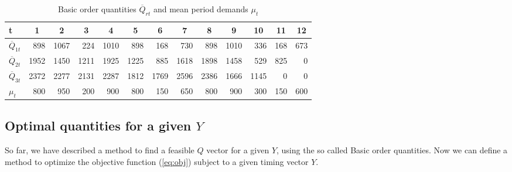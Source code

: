 \begin{table}[bt!]
	\caption{Basic order quantities $\overline Q_{rt}$ and mean period demands $\mu_t$}
	\label{tab:demand}
    \centering
	\begin{tabular}{@{}lrrrrrrrrrrrr@{}}
		\toprule
		t        & \multicolumn{1}{c}{1} & \multicolumn{1}{c}{2} & \multicolumn{1}{c}{3} & \multicolumn{1}{c}{4} & \multicolumn{1}{c}{5} & \multicolumn{1}{c}{6} & \multicolumn{1}{c}{7} & \multicolumn{1}{c}{8} & \multicolumn{1}{c}{9} & \multicolumn{1}{c}{10} & \multicolumn{1}{c}{11} & \multicolumn{1}{c}{12} \\ \midrule
		$\overline Q_{1t}$ & 898                   & 1067                  & 224                   & 1010                  & 898                   & 168                   & 730                   & 898                   & 1010                  & 336                    & 168                    & 673                    \\
		$\overline Q_{2t}$ & 1952                  & 1450                  & 1211                  & 1925                  & 1225                  & 885                   & 1618                  & 1898                  & 1458                  & 529                    & 825                    & 0                      \\
		$\overline Q_{3t}$ & 2372                  & 2277                  & 2131                  & 2287                  & 1812                  & 1769                  & 2596                  & 2386                  & 1666                  & 1145                   & 0                      & 0                      \\ \midrule
		$\mu_t$  & 800                   & 950                   & 200                   & 900                   & 800                   & 150                   & 650                   & 800                   & 900                   & 300                    & 150                    & 600
	\end{tabular}
\end{table}



\subsection{Optimal quantities for a given $Y$}
\label{sec:nlp}
So far, we have described %
a method to find a feasible $Q$ vector for a given $Y$, using the so called Basic order quantities. Now we can define a method to optimize the objective function (\ref{eq:obj}) subject to a given timing vector $Y$.

